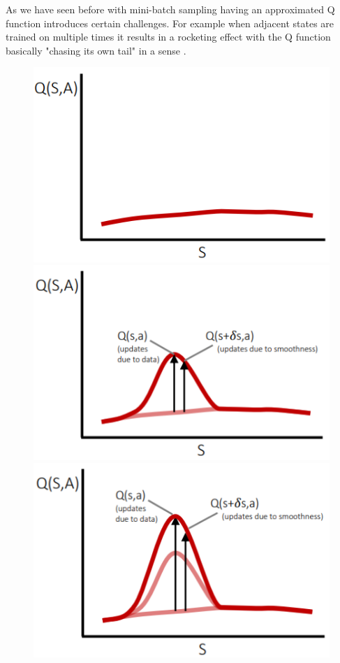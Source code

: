 As we have seen before with mini-batch sampling having an approximated Q function introduces certain challenges. 
For example when adjacent states are trained on multiple times
it results in a rocketing effect with the Q function basically "chasing its own tail" in a sense \cite{lecture_dqn}.  
\begin{figure}[h!h!h!h]
\centering
\includegraphics[scale=0.5]{figures/target 1.PNG}
\includegraphics[scale=0.5]{figures/target 2.PNG}\\
\includegraphics[scale=0.5]{figures/target 3.PNG}

\end{figure}
